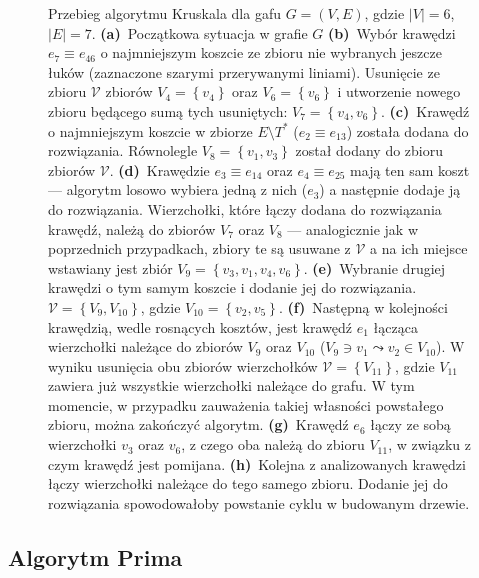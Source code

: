 \begin{figure}[!htbp]
\begin{subfigure}[b]{0.19\textwidth}
		\caption{}
		\label{fig:kruskal:h}
	\end{subfigure}
	\caption{
		Przebieg algorytmu Kruskala dla gafu $G = \left( V, E \right)$, gdzie $\left| V \right| = 6$, $\left| E \right| = 7$.
		\textbf{(a)}~Początkowa sytuacja w grafie $G$
		\textbf{(b)}~Wybór krawędzi $e_{7} \equiv e_{46}$ o najmniejszym koszcie ze zbioru nie wybranych jeszcze łuków (zaznaczone szarymi przerywanymi liniami). Usunięcie ze zbioru $\mathcal{V}$ zbiorów $V_{4} = \left\{ v_{4} \right\}$ oraz $V_{6} = \left\{ v_{6} \right\}$ i utworzenie nowego zbioru będącego sumą tych usuniętych: $V_{7} = \left\{ v_{4}, v_{6} \right\}$.
		\textbf{(c)}~Krawędź o najmniejszym koszcie w zbiorze $E \setminus T^{\ast}$ ($e_{2} \equiv e_{13}$) została dodana do rozwiązania. Równolegle $V_{8} = \left\{ v_{1}, v_{3} \right\}$ został dodany do zbioru zbiorów $\mathcal{V}$.
		\textbf{(d)}~Krawędzie $e_{3} \equiv e_{14}$ oraz $e_{4} \equiv e_{25}$ mają ten sam koszt --- algorytm losowo wybiera jedną z nich ($e_{3}$) a następnie dodaje ją do rozwiązania. Wierzchołki, które łączy dodana do rozwiązania krawędź, należą do zbiorów $V_{7}$ oraz $V_{8}$ --- analogicznie jak w poprzednich przypadkach, zbiory te są usuwane z $\mathcal{V}$ a na ich miejsce wstawiany jest zbiór $V_{9} = \left\{ v_{3}, v_{1}, v_{4}, v_{6} \right\}$.
		\textbf{(e)}~Wybranie drugiej krawędzi o tym samym koszcie i dodanie jej do rozwiązania. $\mathcal{V} = \left\{ V_{9}, V_{10} \right\}$, gdzie $V_{10} = \left\{ v_{2}, v_{5} \right\}$.
		\textbf{(f)}~Następną w kolejności krawędzią, wedle rosnących kosztów, jest krawędź $e_{1}$ łącząca wierzchołki należące do zbiorów $V_{9}$ oraz $V_{10}$ ($V_{9} \ni v_{1} \leadsto v_{2} \in V_{10}$). W wyniku usunięcia obu zbiorów wierzchołków $\mathcal{V} = \left\{ V_{11} \right\}$, gdzie $V_{11}$ zawiera już wszystkie wierzchołki należące do grafu. W tym momencie, w przypadku zauważenia takiej własności powstałego zbioru, można zakończyć algorytm.
		\textbf{(g)}~Krawędź $e_{6}$ łączy ze sobą wierzchołki $v_{3}$ oraz $v_{6}$, z czego oba należą do zbioru $V_{11}$, w związku z czym krawędź jest pomijana.
		\textbf{(h)}~Kolejna z analizowanych krawędzi łączy wierzchołki należące do tego samego zbioru. Dodanie jej do rozwiązania spowodowałoby powstanie cyklu w budowanym drzewie.
	}
	\label{fig:kruskal}
\end{figure}

\subsection{Algorytm Prima}

